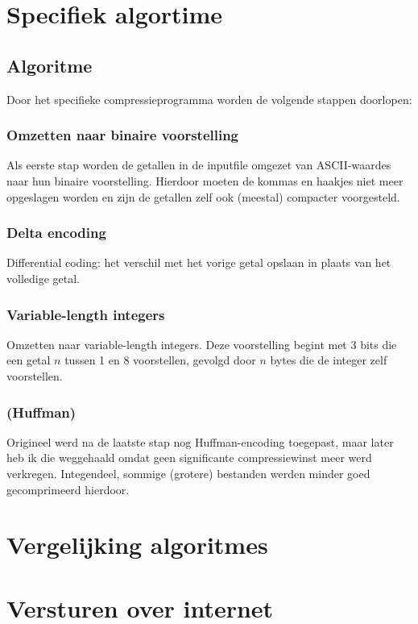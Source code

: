 \documentclass[a4paper]{article}
\begin{document}



\section{Specifiek algortime}

\subsection{Algoritme}
Door het specifieke compressieprogramma worden de volgende stappen doorlopen:
\subsubsection{Omzetten naar binaire voorstelling}
Als eerste stap worden de getallen in de inputfile omgezet van ASCII-waardes naar hun binaire voorstelling. Hierdoor moeten de kommas en haakjes niet meer opgeslagen worden en zijn de getallen zelf ook (meestal) compacter voorgesteld.
\subsubsection{Delta encoding}
Differential coding: het verschil met het vorige getal opslaan in plaats van het volledige getal.
\subsubsection{Variable-length integers}
Omzetten naar variable-length integers. Deze voorstelling begint met 3 bits die een getal $n$ tussen 1 en 8 voorstellen, gevolgd door $n$ bytes die de integer zelf voorstellen.

\subsubsection{(Huffman)}
Origineel werd na de laatste stap nog Huffman-encoding toegepast, maar later heb ik die weggehaald omdat geen significante compressiewinst meer werd verkregen.
Integendeel, sommige (grotere) bestanden werden minder goed gecomprimeerd hierdoor.

\section{Vergelijking algoritmes}


\section{Versturen over internet}

\end{document}
